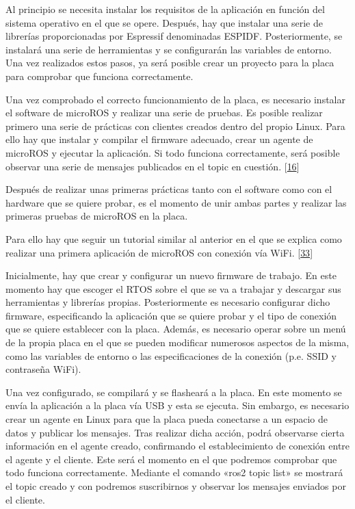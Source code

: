 \documentclass[a4paper,11pt,spanish]{sphinxmanual}
\begin{document}
\sphinxAtStartPar
Al principio se necesita instalar los requisitos de la aplicación en
función del sistema operativo en el que se opere. Después, hay que instalar
una serie de librerías proporcionadas por Espressif denominadas ESP\sphinxhyphen{}IDF.
Posteriormente, se instalará una serie de herramientas y se configurarán las
variables de entorno. Una vez realizados estos pasos, ya será posible crear
un proyecto para la placa para comprobar que funciona correctamente.

\sphinxAtStartPar
Una vez comprobado el correcto funcionamiento de la placa, es necesario
instalar el software de micro\sphinxhyphen{}ROS y realizar una serie de pruebas.
Es posible realizar primero una serie de prácticas con clientes
creados dentro del propio Linux. Para ello hay que instalar y compilar
el firmware adecuado, crear un agente de micro\sphinxhyphen{}ROS y ejecutar la aplicación.
Si todo funciona correctamente, será posible observar una serie de mensajes
publicados en el topic en cuestión. {[}\hyperlink{cite.marco_teorico_y_estado_del_arte:id35}{16}{]}

\sphinxAtStartPar
Después de realizar unas primeras prácticas tanto con el software como con
el hardware que se quiere probar, es el momento de unir ambas partes y realizar
las primeras pruebas de micro\sphinxhyphen{}ROS en la placa.

\sphinxAtStartPar
Para ello hay que seguir un tutorial similar al anterior en el que se explica
como realizar una primera aplicación de micro\sphinxhyphen{}ROS con conexión vía Wi\sphinxhyphen{}Fi.
{[}\hyperlink{cite.marco_teorico_y_estado_del_arte:id36}{33}{]}

\sphinxAtStartPar
Inicialmente, hay que crear y configurar un nuevo firmware de trabajo.
En este momento hay que escoger el RTOS sobre el que se va a trabajar y
descargar sus herramientas y librerías propias. Posteriormente es necesario
configurar dicho firmware, especificando la aplicación que se quiere probar
y el tipo de conexión que se quiere establecer con la placa. Además, es necesario
operar sobre un menú de la propia placa en el que se pueden modificar numerosos
aspectos de la misma, como las variables de entorno o las especificaciones
de la conexión (p.e. SSID y contraseña Wi\sphinxhyphen{}Fi).

\sphinxAtStartPar
Una vez configurado, se compilará y se flasheará a la placa. En este momento
se envía la aplicación a la placa vía USB y esta se ejecuta. Sin embargo, es
necesario crear un agente en Linux para que la placa pueda conectarse a un
espacio de datos y publicar los mensajes. Tras realizar dicha acción, podrá
observarse cierta información en el agente creado, confirmando el establecimiento
de conexión entre el agente y el cliente. Este será el momento en el que podremos
comprobar que todo funciona correctamente. Mediante el comando «ros2 topic list»
se mostrará el topic creado y con  podremos
suscribirnos y observar los mensajes enviados por el cliente.
\end{document}
